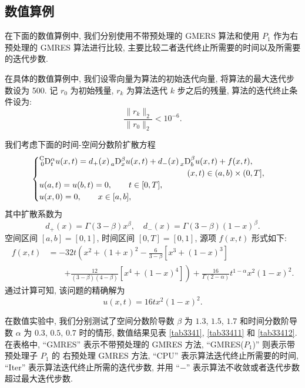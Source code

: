 \documentclass{ecnumaster}
\begin{document}
\subsection{数值算例} %
在下面的数值算例中,
我们分别使用不带预处理的 GMERS 算法和使用 $P_1$ 作为右预处理的 GMRES 算法进行比较,
主要比较二者迭代终止所需要的时间以及所需要的迭代步数.

在具体的数值算例中, 我们设零向量为算法的初始迭代向量, 将算法的最大迭代步数设为 500.
记 $r_0$ 为初始残量, $r_k$ 为算法迭代 $k$ 步之后的残量, 算法的迭代终止条件设为:
\begin{equation}\nonumber
\frac{\|r_{k}\|_2}{\|r_0\|_2}<10^{-6}.
\end{equation}

\bigskip
\begin{example}\label{example-1}
我们考虑下面的时间-空间分数阶扩散方程 %
\begin{equation}
\begin{cases}
\prescript{{\mathrm{C}}}{0}{\mathrm{D}}_t^{\alpha} u(x, t) = d_+(x) \prescript{}{a}{\mathrm{D}}_x^\beta u(x, t) + d_-(x) \prescript{}{x}{\mathrm{D}}_b^\beta u(x, t) + f(x, t), \\
\qquad \qquad \qquad \qquad \qquad \qquad \qquad \qquad \qquad (x, t) \in (a, b) \times (0, T],\\
u(a, t) = u(b, t) = 0,  \qquad t \in [0, T],\\
u(x, 0) = 0, \qquad x \in [a, b],
 \end{cases}
\end{equation}
其中扩散系数为
\begin{equation}
  d_+(x) = \Gamma(3-\beta)x^{\beta}, \quad d_-(x) = \Gamma(3-\beta)(1-x)^{\beta}.
\end{equation}
空间区间 $[a, b] = [0, 1]$, 时间区间 $[0, T] = [0, 1]$,
源项 $f(x, t)$ 形式如下:
\begin{align*}
  f(x, t)
  & = -32t\left( x^2 + (1+x)^2 - \frac{6}{3-\beta}[x^3 + (1-x)^3] \right. \\
  &\quad\quad\left. + \frac{12}{(3-\beta)(4-\beta)}[x^4 +(1-x)^4] \right)
   + \frac{16}{\Gamma(2-\alpha)} t^{1-\alpha} x^2(1-x)^2.
\end{align*}
通过计算可知, 该问题的精确解为
\begin{equation}
  u(x, t) = 16tx^2(1-x)^2.
\end{equation}
\end{example}

在数值实验中, 我们分别测试了空间分数阶导数 $\beta$ 为 $1.3$, $1.5$, $1.7$
和时间分数阶导数 $\alpha$ 为 $0.3$, $0.5$, $0.7$ 时的情形,
数值结果见表 \ref{tab3341}, \ref{tab33411} 和 \ref{tab33412}.
在表格中, “GMRES” 表示不带预处理的 GMRES 方法,
“GMRES($P_1$)” 则表示带预处理子 $P_1$ 的 右预处理 GMRES 方法,
“CPU” 表示算法迭代终止所需要的时间,
“Iter” 表示算法迭代终止所需的迭代步数,
并用 “$-$” 表示算法不收敛或者迭代步数超过最大迭代步数.
\end{document}
